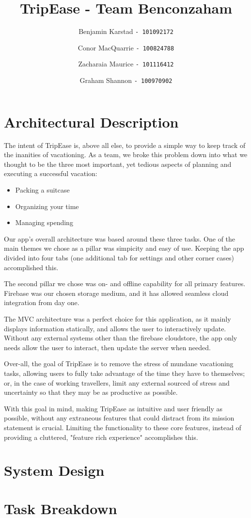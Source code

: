 \documentclass[12pt]{article}
\title{TripEase - Team Benconzaham}
\author{
Benjamin Karstad
\texttt{- 101092172}
\and
Conor MacQuarrie
\texttt{- 100824788}
\and
Zacharaia Maurice
\texttt{- 101116412}
\and
Graham Shannon
\texttt{- 100970902}
}
\begin{document}
	\maketitle
	\pagebreak
	\section*{Architectural Description}
	The intent of TripEase is, above all else, to provide a simple way to keep track of the inanities of vacationing.
	As a team, we broke this problem down into what we thought to be the three most important,
	yet tedious aspects of planning and executing a successful vacation:
	\begin{itemize}
		\item Packing a suitcase
		\item Organizing your time
		\item Managing spending
	\end{itemize}
	Our app's overall architecture was based around these three tasks.
	One of the main themes we chose as a pillar was simpicity and easy of use.
	Keeping the app divided into four tabs (one additional tab for settings and other corner cases) accomplished this.

	The second pillar we chose was on- and offline capability for all primary features.
	Firebase was our chosen storage medium, and it has allowed seamless cloud integration from day one.

	The MVC architecture was a perfect choice for this application, as it mainly displays information statically,
	and allows the user to interactively update.
	Without any external systems other than the firebase cloudstore, the app only needs allow the user to interact,
	then update the server when needed.

	Over-all, the goal of TripEase is to remove the stress of mundane vacationing tasks,
	allowing users to fully take advantage of the time they have to themselves;
	or, in the case of working travellers, limit any external sourced of stress and uncertainty
	so that they may be as productive as possible.

	With this goal in mind, making TripEase as intuitive and user friendly as possible,
	without any extraneous features that could distract from its mission statement is crucial.
	Limiting the functionality to these core features,
	instead of providing a cluttered, "feature rich experience" accomplishes this.

	\pagebreak
	\section*{System Design}
	\pagebreak
	\section*{Task Breakdown}
\end{document}
